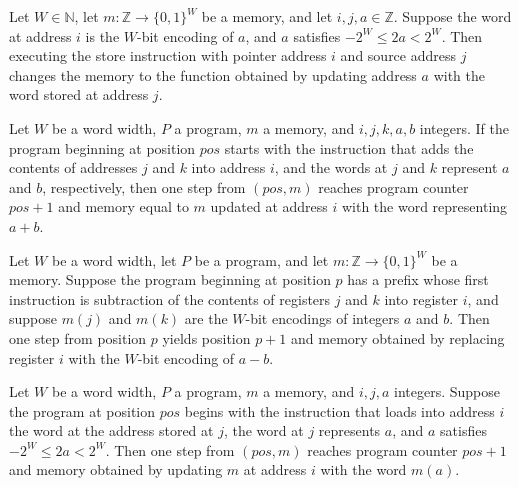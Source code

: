 \begin{theorem}
\label{WordRAM.effect_store}
\leanok
{}
Let $W\in\mathbb{N}$, let $m:\mathbb{Z}\to\{0,1\}^W$ be a memory, and let
$i,j,a\in\mathbb{Z}$. Suppose the word at address $i$ is the $W$-bit encoding of $a$,
and $a$ satisfies $-2^W\le 2a<2^W$. Then executing the store instruction with pointer
address $i$ and source address $j$ changes the memory to the function obtained by
updating address $a$ with the word stored at address $j$.
\end{theorem}

\begin{theorem}
\label{WordRAM.steps_add}
\leanok
{}
Let $W$ be a word width, $P$ a program, $m$ a memory, and $i,j,k,a,b$ integers. If the
program beginning at position $pos$ starts with the instruction that adds the contents
of addresses $j$ and $k$ into address $i$, and the words at $j$ and $k$ represent $a$
and $b$, respectively, then one step from $(pos,m)$ reaches program counter $pos+1$ and
memory equal to $m$ updated at address $i$ with the word representing $a+b$.
\end{theorem}

\begin{theorem}
\label{WordRAM.steps_sub}
\leanok
{}
Let $W$ be a word width, let $P$ be a program, and let $m:\mathbb{Z}\to\{0,1\}^W$ be a
memory. Suppose the program beginning at position $p$ has a prefix whose first
instruction is subtraction of the contents of registers $j$ and $k$ into register $i$,
and suppose $m(j)$ and $m(k)$ are the $W$-bit encodings of integers $a$ and $b$. Then
one step from position $p$ yields position $p+1$ and memory obtained by replacing
register $i$ with the $W$-bit encoding of $a-b$.
\end{theorem}

\begin{theorem}
\label{WordRAM.steps_load}
\leanok
{}
Let $W$ be a word width, $P$ a program, $m$ a memory, and $i,j,a$ integers. Suppose the
program at position $pos$ begins with the instruction that loads into address $i$ the
word at the address stored at $j$, the word at $j$ represents $a$, and $a$ satisfies
$-2^W \le 2a < 2^W$. Then one step from $(pos,m)$ reaches program counter $pos+1$ and
memory obtained by updating $m$ at address $i$ with the word $m(a)$.
\end{theorem}

